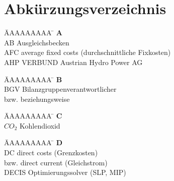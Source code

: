 %
%
%
%

\pagestyle{headings}
\section*{Abkürzungsverzeichnis}

\begin{tabbing}
	\hspace{0.0cm}  \= AAAAAAAAA \=       \hspace{2cm} \kill
	\> \textbf{A} 	\> \\
	\> AB			\> Ausgleichsbecken\\
	\> AFC     		\> average fixed costs (durchschnittliche Fixkosten)\\
	\> AHP 			\> VERBUND Austrian Hydro Power AG\\
\end{tabbing} 

\vspace*{-1.5cm}
\begin{tabbing}
	\hspace{0.0cm}  \= AAAAAAAAA \=       \hspace{2cm} \kill
	\> \textbf{B} 	\> \\
	\> BGV 			\> Bilanzgruppenverantwortlicher\\
	\> bzw. 		\> beziehungsweise\\
\end{tabbing}

\vspace*{-1.5cm}
\begin{tabbing}
	\hspace{0.0cm}  \= AAAAAAAAA \=       \hspace{2cm} \kill
	\>\textbf{C} 	\> \\
	\> $CO_2$ 		\> Kohlendioxid\\
\end{tabbing} 

\vspace*{-1.5cm}
\begin{tabbing}
	\hspace{0.0cm}  \= AAAAAAAAA \=       \hspace{2cm} \kill
	\> \textbf{D} 	\> \\
	\> DC			\> direct costs (Grenzkosten)\\
	\>      		\> bzw. direct current (Gleichstrom)\\
	\> DECIS\footnotemark \> Optimierungssolver (SLP, MIP)\\
\end{tabbing} 

